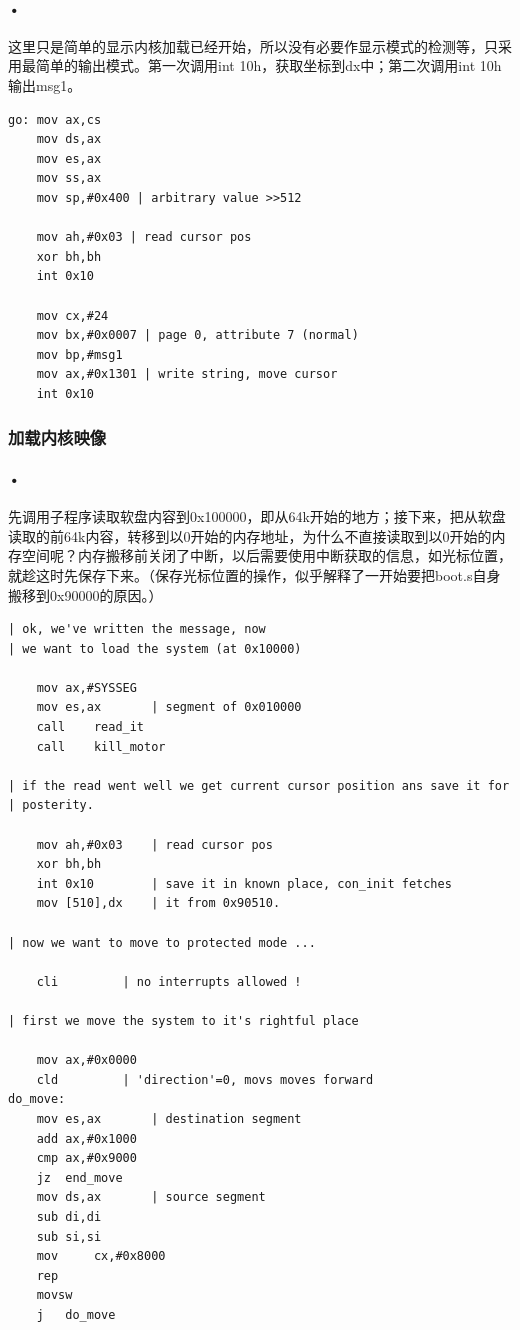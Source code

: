 \documentclass[12pt]{article}
\begin{document}
\paragraph{•}
这里只是简单的显示内核加载已经开始，所以没有必要作显示模式的检测等，只采用最简单的输出模式。第一次调用int 10h，获取坐标到dx中；第二次调用int 10h输出msg1。
\begin{lstlisting}
go:	mov	ax,cs
	mov	ds,ax
	mov	es,ax
	mov	ss,ax
	mov	sp,#0x400 | arbitrary value >>512

	mov	ah,#0x03 | read cursor pos
	xor	bh,bh
	int	0x10
	
	mov	cx,#24
	mov	bx,#0x0007 | page 0, attribute 7 (normal)
	mov	bp,#msg1
	mov	ax,#0x1301 | write string, move cursor
	int	0x10
\end{lstlisting}	
\subsubsection{加载内核映像}
\paragraph{•}
先调用子程序读取软盘内容到0x100000，即从64k开始的地方；接下来，把从软盘读取的前64k内容，转移到以0开始的内存地址，为什么不直接读取到以0开始的内存空间呢？内存搬移前关闭了中断，以后需要使用中断获取的信息，如光标位置，就趁这时先保存下来。（保存光标位置的操作，似乎解释了一开始要把boot.s自身搬移到0x90000的原因。）
\begin{lstlisting}[breaklines]
| ok, we've written the message, now
| we want to load the system (at 0x10000)

	mov	ax,#SYSSEG
	mov	es,ax		| segment of 0x010000
	call	read_it
	call	kill_motor

| if the read went well we get current cursor position ans save it for
| posterity.

	mov	ah,#0x03	| read cursor pos
	xor	bh,bh
	int	0x10		| save it in known place, con_init fetches
	mov	[510],dx	| it from 0x90510.
		
| now we want to move to protected mode ...

	cli			| no interrupts allowed !

| first we move the system to it's rightful place

	mov	ax,#0x0000
	cld			| 'direction'=0, movs moves forward
do_move:
	mov	es,ax		| destination segment
	add	ax,#0x1000
	cmp	ax,#0x9000
	jz	end_move
	mov	ds,ax		| source segment
	sub	di,di
	sub	si,si
	mov 	cx,#0x8000
	rep
	movsw
	j	do_move
\end{lstlisting}	
\end{document}
